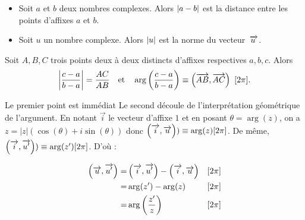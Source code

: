 \documentclass{magnolia}
\begin{document}


\begin{proposition}[utile=-3]
\begin{itemize}
\item Soit $a$ et $b$ deux nombres complexes. Alors $\left|a-b\right|$ est la distance entre les points d'affixes $a$ et $b$.
\item Soit $u$ un nombre complexe. Alors $\left|u\right|$ est la norme du vecteur
$\kern 2pt\overrightarrow{\kern -2ptu}$.
\end{itemize}
\end{proposition}

\begin{proposition}[utile=-3]
Soit $A,B,C$ trois points deux à deux distincts d'affixes respectives $a,b,c$. Alors
\[\left|\frac{c-a}{b-a}\right| = \frac{AC}{AB} \quad\text{et}\quad   \arg\left(\frac{c-a}{b-a}\right)\equiv\left(\overrightarrow{AB}, \overrightarrow{AC}\right)\  [2 \pi].\]
\end{proposition}

\begin{preuve}
Le premier point est immédiat Le second découle de l'interprétation géométrique de l'argument. En notant $\overrightarrow{i}$ le vecteur d'affixe $1$ et en posant $\theta=\arg(z)$, on a $z=|z|(\cos(\theta)+i\sin(\theta))$ donc $\left(\overrightarrow{i}, \overrightarrow{u}\right))\equiv \arg(z)[2\pi]$. De même, $\left(\overrightarrow{i}, \overrightarrow{u'}\right))\equiv \arg(z')[2\pi]$. D'où :


\begin{eqnarray*}
\left(\overrightarrow{u}, \overrightarrow{u'}\right)=& \left(\overrightarrow{i}, \overrightarrow{u'}\right)-\left(\overrightarrow{i}, \overrightarrow{u}\right)&[2\pi]\\
=&  \arg(z')-\arg(z)   &[2\pi]\\
=& \arg\left(\frac{z'}{z}\right) &[2\pi]
\end{eqnarray*}
\end{preuve}
\end{document}
